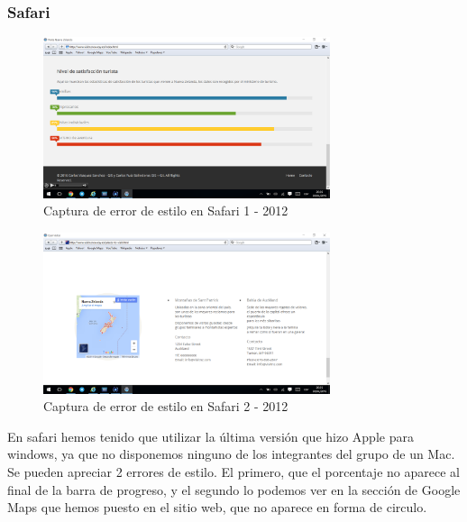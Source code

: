 \subsubsection{Safari}
\begin{figure}[h]
	\centering
	\includegraphics[width=0.75\textwidth]{./Fotos/safari-capture.png}
	\caption{Captura de error de estilo en Safari 1 - 2012}
	\label{fig: ejemplo}
\end{figure}
\begin{figure}[h]
	\centering
	\includegraphics[width=0.75\textwidth]{./Fotos/safari2-capture.png}
	\caption{Captura de error de estilo en Safari 2 - 2012}
	\label{fig: ejemplo}
\end{figure}
En safari hemos tenido que utilizar la última versión que hizo Apple para windows, ya que no disponemos ninguno de los integrantes del grupo de un Mac. Se pueden apreciar 2 errores de estilo. El primero, que el porcentaje no aparece al final de la barra de progreso, y el segundo lo podemos ver en la sección de Google Maps que hemos puesto en el sitio web, que no aparece en forma de circulo. 
